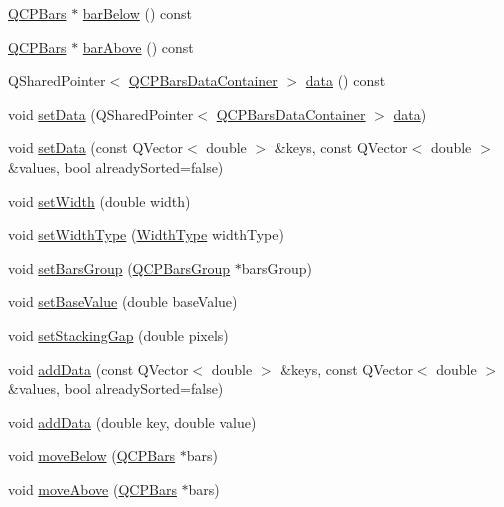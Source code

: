 \begin{DoxyCompactItemize}
\item 
\hyperlink{classQCPBars}{Q\+C\+P\+Bars} $\ast$ \hyperlink{classQCPBars_a2c46a686cbad95f180ca3c2e88263961}{bar\+Below} () const 
\item 
\hyperlink{classQCPBars}{Q\+C\+P\+Bars} $\ast$ \hyperlink{classQCPBars_a9ca48a6577586825d85bdc1fbf410803}{bar\+Above} () const 
\item 
Q\+Shared\+Pointer$<$ \hyperlink{classQCPDataContainer}{Q\+C\+P\+Bars\+Data\+Container} $>$ \hyperlink{classQCPBars_afa75a82bb667d0300da551b47771ac5f}{data} () const 
\item 
void \hyperlink{classQCPBars_a6dc562ec7120a8521e1061f2134367e4}{set\+Data} (Q\+Shared\+Pointer$<$ \hyperlink{classQCPDataContainer}{Q\+C\+P\+Bars\+Data\+Container} $>$ \hyperlink{classQCPBars_afa75a82bb667d0300da551b47771ac5f}{data})
\item 
void \hyperlink{classQCPBars_a2a88cd5b16ec7b71e5a590f95b50c5ce}{set\+Data} (const Q\+Vector$<$ double $>$ \&keys, const Q\+Vector$<$ double $>$ \&values, bool already\+Sorted=false)
\item 
void \hyperlink{classQCPBars_afec6116579d44d5b706e0fa5e5332507}{set\+Width} (double width)
\item 
void \hyperlink{classQCPBars_adcaa3b41281bb2c0f7949b341592fcc0}{set\+Width\+Type} (\hyperlink{classQCPBars_a65dbbf1ab41cbe993d71521096ed4649}{Width\+Type} width\+Type)
\item 
void \hyperlink{classQCPBars_aedd1709061f0b307c47ddb45e172ef9a}{set\+Bars\+Group} (\hyperlink{classQCPBarsGroup}{Q\+C\+P\+Bars\+Group} $\ast$bars\+Group)
\item 
void \hyperlink{classQCPBars_a574ec7eb7537566df1a28ff085d75623}{set\+Base\+Value} (double base\+Value)
\item 
void \hyperlink{classQCPBars_aeacf7561afb1c70284b22822b57c7bb5}{set\+Stacking\+Gap} (double pixels)
\item 
void \hyperlink{classQCPBars_a323d6970d6d6e3166d89916a7f60f733}{add\+Data} (const Q\+Vector$<$ double $>$ \&keys, const Q\+Vector$<$ double $>$ \&values, bool already\+Sorted=false)
\item 
void \hyperlink{classQCPBars_a684dd105403a5497fda42f2094fecbb7}{add\+Data} (double key, double value)
\item 
void \hyperlink{classQCPBars_a69fc371346980f19177c3d1ecdad78ee}{move\+Below} (\hyperlink{classQCPBars}{Q\+C\+P\+Bars} $\ast$bars)
\item 
void \hyperlink{classQCPBars_ac22e00a6a41509538c21b04f0a57318c}{move\+Above} (\hyperlink{classQCPBars}{Q\+C\+P\+Bars} $\ast$bars)

\end{DoxyCompactItemize}
